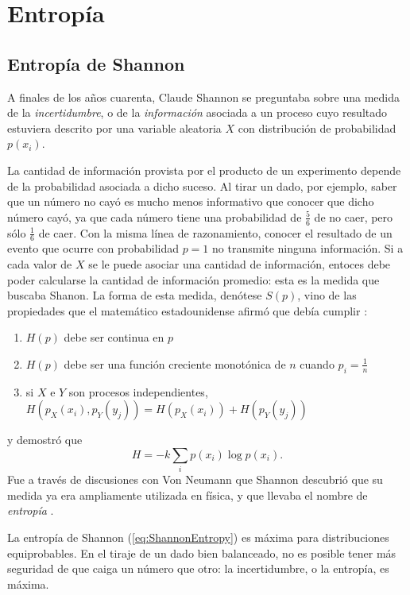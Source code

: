 \section{Entropía}
\subsection{Entropía de Shannon}
A finales de los años cuarenta, Claude Shannon se preguntaba sobre una medida de la \textit{incertidumbre}, o de la \textit{información} asociada a un proceso cuyo resultado estuviera descrito por una variable aleatoria $X$ con distribución de probabilidad $p(x_{i})$.

La cantidad de información provista por el producto de un experimento depende de la probabilidad asociada a dicho suceso. Al tirar un dado, por ejemplo, saber que un número no cayó es mucho menos informativo que conocer que dicho número cayó, ya que cada número tiene una probabilidad de $\frac{5}{6}$ de no caer, pero sólo $\frac{1}{6}$ de caer. Con la misma línea de razonamiento, conocer el resultado de un evento que ocurre con probabilidad $p=1$ no transmite ninguna información. Si a cada valor de $X$ se le puede asociar una cantidad de información, entoces debe poder calcularse la cantidad de información promedio: esta es la medida que buscaba Shanon. La forma de esta medida, denótese $S(p)$, vino de las propiedades que el matemático estadounidense afirmó que debía cumplir \cite{Shannon} \cite{Wilde}:
\begin{enumerate}
    \item $H(p)$ debe ser continua en $p$
    \item $H(p)$ debe ser una función creciente monotónica de $n$ cuando $p_{i}=\frac{1}{n}$
    \item si $X$ e $Y$ son procesos independientes, $H(p_{X}(x_{i}),p_{Y}(y_{j}))=H(p_{X}(x_{i}))+H(p_{Y}(y_{j}))$
\end{enumerate}
y demostró que
\begin{equation}\label{eq:ShannonEntropy}
    H=-k\sum_{i}p(x_{i})\log{p(x_{i})}.
\end{equation}
Fue a través de discusiones con Von Neumann que Shannon descubrió que su medida ya era ampliamente utilizada en física, y que llevaba el nombre de \textit{entropía} \cite{McIrvine}.

La entropía de Shannon (\ref{eq:ShannonEntropy}) es máxima para distribuciones equiprobables. En el tiraje de un dado bien balanceado, no es posible tener más seguridad de que caiga un número que otro: la incertidumbre, o la entropía, es máxima.

